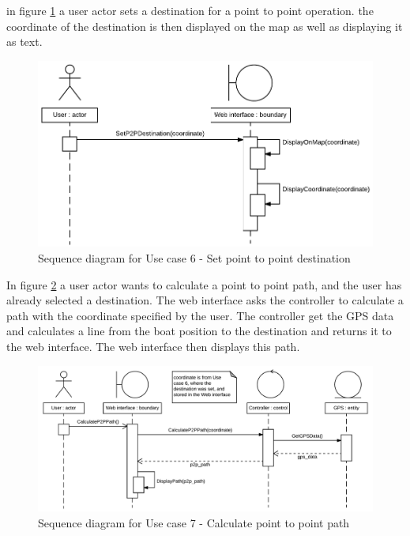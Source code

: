 in figure \ref{fig:seq:uc6} a user actor sets a destination for a point to point operation. the coordinate of the destination is then displayed on the map as well as displaying it as text.

\begin{figure}[H]
	\centering
	\includegraphics[width=1\linewidth]{Images/System_architecture/Use_case_6_SD}
	\caption{Sequence diagram for Use case 6 - Set point to point destination}
	\label{fig:seq:uc6}
\end{figure}

In figure \ref{fig:seq:uc7} a user actor wants to calculate a point to point path, and the user has already selected a destination. The web interface asks the controller to calculate a path with the coordinate specified by the user. The controller get the GPS data and calculates a line from the boat position to the destination and returns it to the web interface. The web interface then displays this path.

\begin{figure}[H]
	\centering
	\includegraphics[width=1\linewidth]{Images/System_architecture/Use_case_7_SD}
	\caption{Sequence diagram for Use case 7 - Calculate point to point path}
	\label{fig:seq:uc7}
\end{figure}

